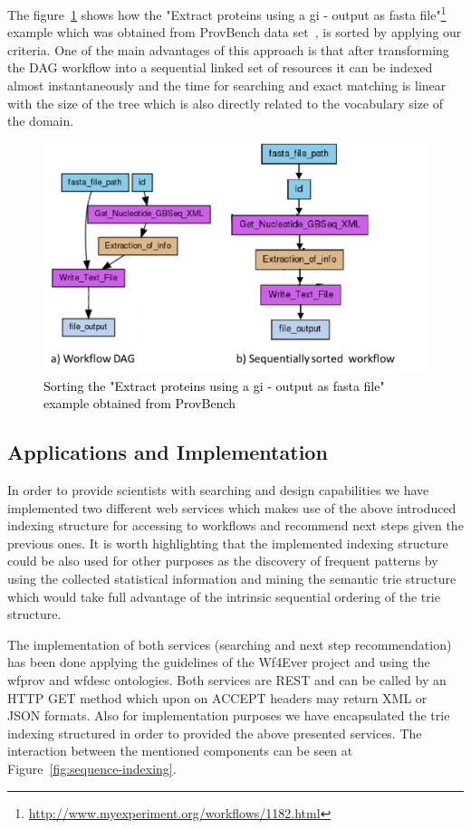 The figure~\ref{fig:sorting-workflow} shows how the "Extract proteins using a gi - output as fasta file"\footnote{\url{http://www.myexperiment.org/workflows/1182.html}} example which was obtained from ProvBench data set~\cite{khalid_13}, is sorted by applying our criteria. One of the main advantages of this approach is that after transforming the DAG workflow into a sequential linked set of resources it can be indexed almost instantaneously and the time for searching and exact matching is linear with the size of the tree which is also directly related to the vocabulary size of the domain.

\begin{figure}[ht!]
\centering
\includegraphics[scale=0.70]{Figures/sorting-workflow.png}
\caption{\textcolor{black}{Sorting the "Extract proteins using a gi - output as fasta file" example obtained from ProvBench}}
\label{fig:sorting-workflow}
\end{figure}

\subsection{Applications and Implementation}
In order to provide scientists with searching and design capabilities we have implemented two different web services which makes use of the above introduced indexing structure for accessing to workflows and recommend next steps given the previous ones. It is worth highlighting that the implemented indexing structure could be also used for other purposes as the discovery of frequent patterns by using the collected statistical information and mining the semantic trie structure which would take full advantage of the intrinsic sequential ordering of the trie structure. 

The implementation of both services (searching and next step recommendation) has been done applying the guidelines of the Wf4Ever project and using the wfprov and wfdesc ontologies. Both services are REST and can be called by an HTTP GET method which upon on ACCEPT headers may return XML or JSON formats. Also for implementation purposes we have encapsulated the trie indexing structured in order to provided the above presented services. The interaction between the mentioned components can be seen at Figure~\ref{fig:sequence-indexing}.
 
